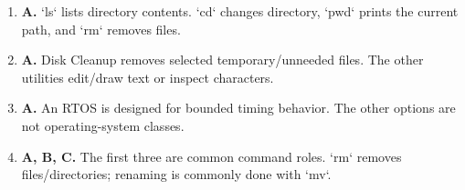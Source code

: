 \begin{enumerate}[label=\textbf{Q\arabic*.}, leftmargin=*]
\item \textbf{A.} `ls` lists directory contents. `cd` changes directory, `pwd` prints the current path, and `rm` removes files.

\item \textbf{A.} Disk Cleanup removes selected temporary/unneeded files. The other utilities edit/draw text or inspect characters.

\item \textbf{A.} An RTOS is designed for bounded timing behavior. The other options are not operating-system classes.

\item \textbf{A, B, C.} The first three are common command roles. `rm` removes files/directories; renaming is commonly done with `mv`.

\end{enumerate}
